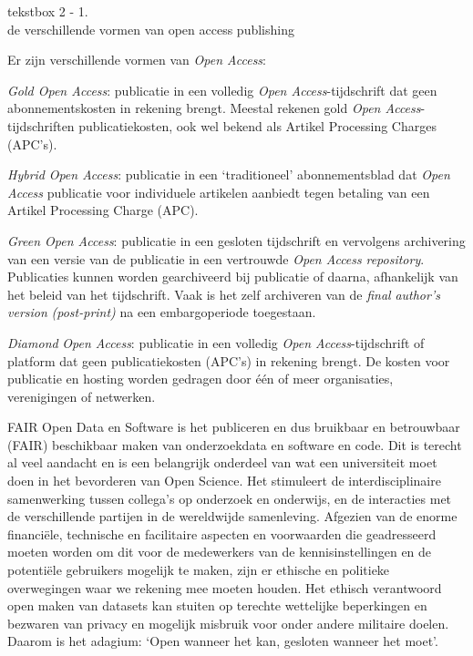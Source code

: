 \documentclass[empirical, authordate, ]{new-jote-article}
\begin{document}
	\begin{bookbox}{\raggedright tekstbox 2 - 1. \\de verschillende vormen van open access publishing}
		Er zijn verschillende vormen van \emph{Open Access}:

		\vspace*{\baselineskip}

		\emph{Gold Open Access}: publicatie in een volledig \emph{Open Access}-tijdschrift dat geen abonnementskosten in rekening brengt. Meestal rekenen gold \emph{Open Access}-tijdschriften publicatiekosten, ook wel bekend als Artikel Processing Charges (APC's).

		\vspace*{\baselineskip}

		\emph{Hybrid}\emph{ Open Access}: publicatie in een ‘traditioneel' abonnementsblad dat \emph{Open Access} publicatie voor individuele artikelen aanbiedt tegen betaling van een Artikel Processing Charge (APC).

		\vspace*{\baselineskip}

		\emph{Green Open Access}: publicatie in een gesloten tijdschrift en vervolgens archivering van een versie van de publicatie in een vertrouwde \emph{Open Access} \emph{repository}. Publicaties kunnen worden gearchiveerd bij publicatie of daarna, afhankelijk van het beleid van het tijdschrift. Vaak is het zelf archiveren van de\emph{ }\emph{final}\emph{ }\emph{author's}\emph{ }\emph{version}\emph{ (post-print)} na een embargoperiode toegestaan.

		\vspace*{\baselineskip}

		\emph{Diamond}\emph{ Open Access}: publicatie in een volledig \emph{Open Access}-tijdschrift of platform dat geen publicatiekosten (APC's) in rekening brengt. De kosten voor publicatie en hosting worden gedragen door één of meer organisaties, verenigingen of netwerken.
	\end{bookbox}

	FAIR Open Data en Software is het publiceren en dus bruikbaar en betrouwbaar (FAIR) beschikbaar maken van onderzoekdata en software en code. Dit is terecht al veel aandacht en is een belangrijk onderdeel van wat een universiteit moet doen in het bevorderen van Open Science. Het stimuleert de interdisciplinaire samenwerking tussen collega's op onderzoek en onderwijs, en de interacties met de verschillende partijen in de wereldwijde samenleving. Afgezien van de enorme financiële, technische en facilitaire aspecten en voorwaarden die geadresseerd moeten worden om dit voor de medewerkers van de kennisinstellingen en de potentiële gebruikers mogelijk te maken, zijn er ethische en politieke overwegingen waar we rekening mee moeten houden. Het ethisch verantwoord open maken van datasets kan stuiten op terechte wettelijke beperkingen en bezwaren van privacy en mogelijk misbruik voor onder andere militaire doelen. Daarom is het adagium: ‘Open wanneer het kan, gesloten wanneer het moet'.
\end{document}
